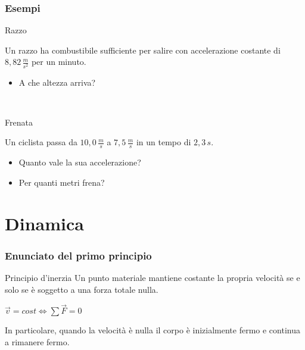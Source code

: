 \documentclass[]{beamer}
\theoremstyle{plain}
\begin{document}
\begin{frame}
\frametitle{Esempi}
\begin{exampleblock}{Razzo}
\begin{small}
Un razzo ha combustibile sufficiente per salire con accelerazione costante di $ 8,82 \, \frac{m}{s^2} $ per un minuto.
\begin{itemize}
  \item A che altezza arriva?
\end{itemize}
\end{small}
\end{exampleblock}

~


\begin{exampleblock}{Frenata}
\begin{small}
Un ciclista passa da $ 10,0 \, \frac{m}{s} $ a $ 7,5 \, \frac{m}{s} $ in un tempo di $ 2,3 \, s $.
\begin{itemize}
  \item Quanto vale la sua accelerazione?
  \item Per quanti metri frena?
\end{itemize}
\end{small}
\end{exampleblock}

\end{frame}




\section{Dinamica}


\begin{frame}
  \frametitle{Enunciato del primo principio}
\begin{block}{Principio d'inerzia}
Un punto materiale mantiene costante la propria velocità se e solo se è soggetto a una forza totale nulla.
\begin{center}
\colorbox{blue!30}{$ \vec{v} = cost \Longleftrightarrow \sum \vec{F} = 0 $}\pause
\end{center}
In particolare, quando la velocità è nulla il corpo è inizialmente fermo e continua a rimanere fermo.
\end{block}
\end{frame}
\end{document}
